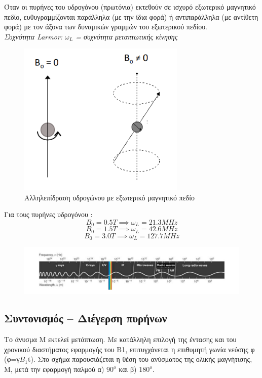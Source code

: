 \documentclass{article}
\begin{document}
\clearpage
Όταν	 οι	 πυρήνες	 του	 υδρογόνου	 (πρωτόνια)	 εκτεθούν	 σε	
ισχυρό	 εξωτερικό	 μαγνητικό	 πεδίο,	 ευθυγραμμίζονται	
παράλληλα	(με	την	ίδια	φορά)	ή	αντιπαράλληλα	(με	αντίθετη	
φορά)	με	τον	άξονα	των	δυναμικών	γραμμών	του	εξωτερικού	
πεδίου. \\
\textit{Συχνότητα	Larmor: $ω_L$ = συχνότητα	
μεταπτωτικής	κίνησης	}
\begin{figure}[h!]	
     \centering
  \includegraphics[width=80mm,scale=2]{ms.png}
  \caption{Αλληλεπίδραση υδρογώνου	με	εξωτερικό	μαγνητικό	πεδίο}
\end{figure}

Για	τους	πυρήνες	υδρογόνου	:	
\begin{equation*}
    Β_0	=	0.5	Τ \implies ω_L = 21.3	ΜHz 
\end{equation*}
\begin{equation*}
    Β_0	=	1.5	Τ \implies ω_L = 42.6	ΜHz 
\end{equation*}
\begin{equation*}
    Β_0	=	3.0	Τ \implies ω_L = 127.7	ΜHz 
\end{equation*}
\begin{figure}[h!]	
     \centering
     \advance\leftskip-0.8cm  
  \includegraphics[width=140mm,scale=2]{msa.png}
 
\end{figure}
\clearpage
\subsection{Συντονισμός	–	Διέγερση	πυρήνων}
Το	 άνυσμα	 Μ	 εκτελεί	 μετάπτωση.	 Με	 κατάλληλη	
επιλογή	της	έντασης	και	του	χρονικού	διαστήματος	
εφαρμογής	 του	 Β1,	 επιτυγχάνεται	 η	 επιθυμητή	
γωνία	νεύσης	φ (φ=γ$Β_1$t).	Στο	σχήμα	παρουσιάζεται	
η	 θέση	 του	 ανύσματος	 της	 ολικής	 μαγνήτισης,	Μ,	
μετά	την	εφαρμογή	παλμού	α)	$90^{ο}$	και	β)	$180^{ο}$.	
\end{document}
